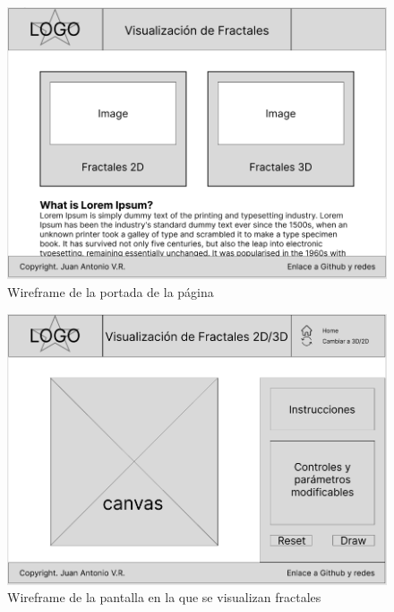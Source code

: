 \vspace*{\fill}

\begin{figure} [ht]
    \centering
    \includegraphics[width=11.5cm]{img/C6/wireframe-home.png}
    \caption{Wireframe de la portada de la página}
    \label{fig:wireframe-home}
    \end{figure}

    \vspace*{\fill}

\begin{figure} [ht]
    \centering
    \includegraphics[width=11.5cm]{img/C6/wireframe-1.png}
    \caption{Wireframe de la pantalla en la que se visualizan fractales}
        \label{fig:wireframe-fractals}
    \end{figure}


\vspace*{\fill}